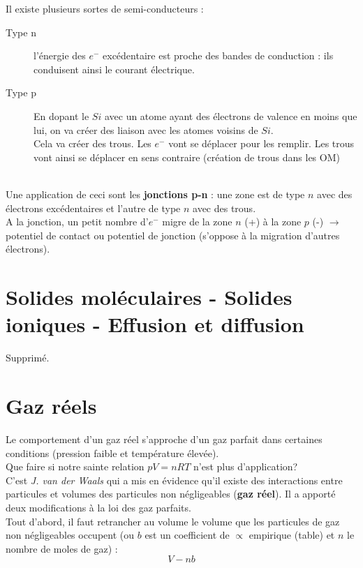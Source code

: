 \documentclass	[11pt, a4paper, openany]{book}
\begin{document}
	Il existe plusieurs sortes de semi-conducteurs : 
	\begin{description}
		\item[Type n] l'énergie des $e^-$ excédentaire est proche des bandes de conduction : ils conduisent ainsi le courant électrique.
		\item[Type p] En dopant le $Si$ avec un atome ayant des électrons de valence en moins que lui, on va créer des liaison avec les atomes voisins de $Si$.\\
		Cela va créer des trous. Les $e^-$ vont se déplacer pour les remplir. Les trous vont ainsi se déplacer en sens contraire (création de trous dans les OM)
	\end{description}
	\ \\
	
	Une application de ceci sont les \textbf{jonctions p-n} : une zone est de type $n$ avec des électrons excédentaires et l'autre de type $n$ avec des trous.\\
	A la jonction, un petit nombre d'$e^-$ migre de la zone $n$ (+) à la zone $p$ (-) $\rightarrow$ potentiel de contact ou potentiel de jonction (s'oppose à la migration d'autres électrons).
	
	
	
	\section{Solides moléculaires - Solides ioniques - Effusion et diffusion}
	Supprimé.
	
	\section{Gaz réels}
	Le comportement d'un gaz réel s'approche d'un gaz parfait dans certaines conditions (pression faible et température élevée).\\
	Que faire si notre sainte relation $pV = nRT$ n'est plus d'application? \\
	
	C'est \textit{J. van der Waals} qui a mis en évidence qu'il existe des interactions entre particules et volumes des particules non négligeables (\textbf{gaz réel}). Il a apporté deux modifications à la loi des gaz parfaits.\\
	
	Tout d'abord, il faut retrancher au volume le volume que les particules de gaz non négligeables occupent (ou $b$ est un coefficient de $\propto$ empirique (table) et $n$ le nombre de moles de gaz) :
	$$V - nb$$
	
\end{document}
